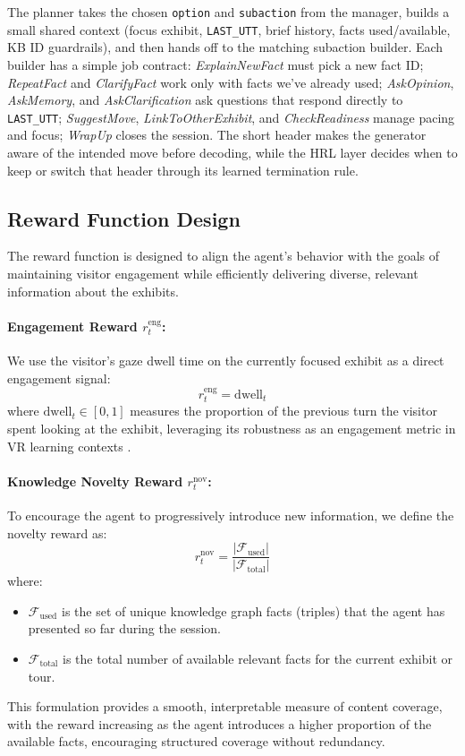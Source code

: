 \documentclass[12pt]{article}
\begin{document}
The planner takes the chosen \texttt{option} and \texttt{subaction} from the manager, builds a small shared context (focus exhibit, \texttt{LAST\_UTT}, brief history, facts used/available, KB ID guardrails), and then hands off to the matching subaction builder. Each builder has a simple job contract: \textit{ExplainNewFact} must pick a new fact ID; \textit{RepeatFact} and \textit{ClarifyFact} work only with facts we’ve already used; \textit{AskOpinion}, \textit{AskMemory}, and \textit{AskClarification} ask questions that respond directly to \texttt{LAST\_UTT}; \textit{SuggestMove}, \textit{LinkToOtherExhibit}, and \textit{CheckReadiness} manage pacing and focus; \textit{WrapUp} closes the session. The short header makes the generator aware of the intended move before decoding, while the HRL layer decides when to keep or switch that header through its learned termination rule.

\subsection{Reward Function Design}
\label{sec:reward-design}

The reward function is designed to align the agent's behavior with the goals of maintaining visitor engagement while efficiently delivering diverse, relevant information about the exhibits.

\paragraph{Engagement Reward $r^{\text{eng}}_t$:}  
We use the visitor's gaze dwell time on the currently focused exhibit as a direct engagement signal:
\[
r^{\text{eng}}_t = \text{dwell}_t
\]
where $\text{dwell}_t \in [0, 1]$ measures the proportion of the previous turn the visitor spent looking at the exhibit, leveraging its robustness as an engagement metric in VR learning contexts \citep{Bozkir2021, Dubovi2022, Mikhailenko2022}.

\paragraph{Knowledge Novelty Reward $r^{\text{nov}}_t$:}  
To encourage the agent to progressively introduce new information, we define the novelty reward as:
\[
r^{\text{nov}}_t = \frac{|\mathcal{F}_{\text{used}}|}{|\mathcal{F}_{\text{total}}|}
\]
where:
\begin{itemize}
    \item $\mathcal{F}_{\text{used}}$ is the set of unique knowledge graph facts (triples) that the agent has presented so far during the session.
    \item $\mathcal{F}_{\text{total}}$ is the total number of available relevant facts for the current exhibit or tour.
\end{itemize}
This formulation provides a smooth, interpretable measure of content coverage, with the reward increasing as the agent introduces a higher proportion of the available facts, encouraging structured coverage without redundancy.
\end{document}

